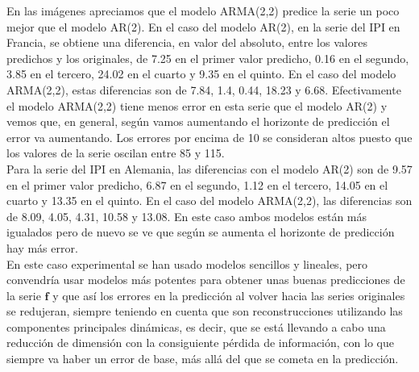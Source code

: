 En las imágenes apreciamos que el modelo ARMA(2,2) predice la serie un poco mejor que el modelo AR(2). En el caso del modelo AR(2), en la serie del IPI en Francia, se obtiene una diferencia, en valor del absoluto, entre los valores predichos y los originales, de 7.25 en el primer valor predicho, 0.16 en el segundo, 3.85 en el tercero, 24.02 en el cuarto y 9.35 en el quinto. En el caso del modelo ARMA(2,2), estas diferencias son de 7.84, 1.4, 0.44, 18.23 y 6.68. Efectivamente el modelo ARMA(2,2) tiene menos error en esta serie que el modelo AR(2) y vemos que, en general, según vamos aumentando el horizonte de predicción el error va aumentando. Los errores por encima de 10 se consideran altos puesto que los valores de la serie oscilan entre 85 y 115.\\

Para la serie del IPI en Alemania, las diferencias con el modelo AR(2) son de 9.57 en el primer valor predicho, 6.87 en el segundo, 1.12 en el tercero, 14.05 en el cuarto y 13.35 en el quinto. En el caso del modelo ARMA(2,2), las diferencias son de 8.09, 4.05, 4.31, 10.58 y 13.08. En este caso ambos modelos están más igualados pero de nuevo se ve que según se aumenta el horizonte de predicción hay más error.\\

En este caso experimental se han usado modelos sencillos y lineales, pero convendría usar modelos más potentes para obtener unas buenas predicciones de la serie $\mathbf{f}$ y que así los errores en la predicción al volver hacia las series originales se redujeran, siempre teniendo en cuenta que son reconstrucciones utilizando las componentes principales dinámicas, es decir, que se está llevando a cabo una reducción de dimensión con la consiguiente pérdida de información, con lo que siempre va haber un error de base, más allá del que se cometa en la predicción.




%
